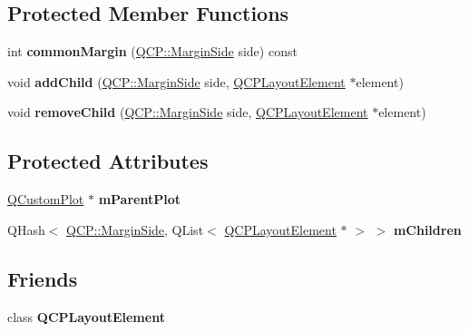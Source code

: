 \subsection*{Protected Member Functions}
\begin{DoxyCompactItemize}
\item 
\hypertarget{classQCPMarginGroup_aeaeba9068dba2ef8be41449f0f2582f7}{}int {\bfseries common\+Margin} (\hyperlink{namespaceQCP_a7e487e3e2ccb62ab7771065bab7cae54}{Q\+C\+P\+::\+Margin\+Side} side) const \label{classQCPMarginGroup_aeaeba9068dba2ef8be41449f0f2582f7}

\item 
\hypertarget{classQCPMarginGroup_acb9c3a35acec655c2895b7eb95ee0524}{}void {\bfseries add\+Child} (\hyperlink{namespaceQCP_a7e487e3e2ccb62ab7771065bab7cae54}{Q\+C\+P\+::\+Margin\+Side} side, \hyperlink{classQCPLayoutElement}{Q\+C\+P\+Layout\+Element} $\ast$element)\label{classQCPMarginGroup_acb9c3a35acec655c2895b7eb95ee0524}

\item 
\hypertarget{classQCPMarginGroup_a20ab3286062957d99b58db683fe725b0}{}void {\bfseries remove\+Child} (\hyperlink{namespaceQCP_a7e487e3e2ccb62ab7771065bab7cae54}{Q\+C\+P\+::\+Margin\+Side} side, \hyperlink{classQCPLayoutElement}{Q\+C\+P\+Layout\+Element} $\ast$element)\label{classQCPMarginGroup_a20ab3286062957d99b58db683fe725b0}

\end{DoxyCompactItemize}
\subsection*{Protected Attributes}
\begin{DoxyCompactItemize}
\item 
\hypertarget{classQCPMarginGroup_a23cfa29e3cc0f33a59141b77d8c04edf}{}\hyperlink{classQCustomPlot}{Q\+Custom\+Plot} $\ast$ {\bfseries m\+Parent\+Plot}\label{classQCPMarginGroup_a23cfa29e3cc0f33a59141b77d8c04edf}

\item 
\hypertarget{classQCPMarginGroup_a954bc89ff8958b9bb6a4a0d08ed5fc0f}{}Q\+Hash$<$ \hyperlink{namespaceQCP_a7e487e3e2ccb62ab7771065bab7cae54}{Q\+C\+P\+::\+Margin\+Side}, Q\+List$<$ \hyperlink{classQCPLayoutElement}{Q\+C\+P\+Layout\+Element} $\ast$ $>$ $>$ {\bfseries m\+Children}\label{classQCPMarginGroup_a954bc89ff8958b9bb6a4a0d08ed5fc0f}

\end{DoxyCompactItemize}
\subsection*{Friends}
\begin{DoxyCompactItemize}
\item 
\hypertarget{classQCPMarginGroup_a0790750c7e7f14fdbd960d172655b42b}{}class {\bfseries Q\+C\+P\+Layout\+Element}\label{classQCPMarginGroup_a0790750c7e7f14fdbd960d172655b42b}

\end{DoxyCompactItemize}


